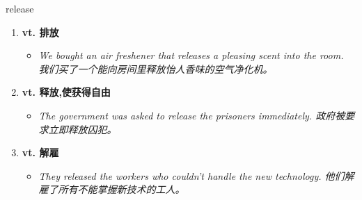 
\begin{frame}
{\huge release}
\begin{center}
\begin{enumerate}\Large
  \item \textbf{vt. 排放}
  \begin{itemize}
    \item \em{\Large{We bought an air freshener that releases a pleasing scent into the room. 我们买了一个能向房间里释放怡人香味的空气净化机。}}
  \end{itemize}
  \item \textbf{vt. 释放,使获得自由}
  \begin{itemize}
    \item \em{\Large{The government was asked to release the prisoners immediately. 政府被要求立即释放囚犯。}}
  \end{itemize}
  \item \textbf{vt. 解雇}
  \begin{itemize}
    \item \em{\Large{They released the workers who couldn't handle the new technology. 他们解雇了所有不能掌握新技术的工人。}}
  \end{itemize}
\end{enumerate}
\end{center}
\end{frame}
